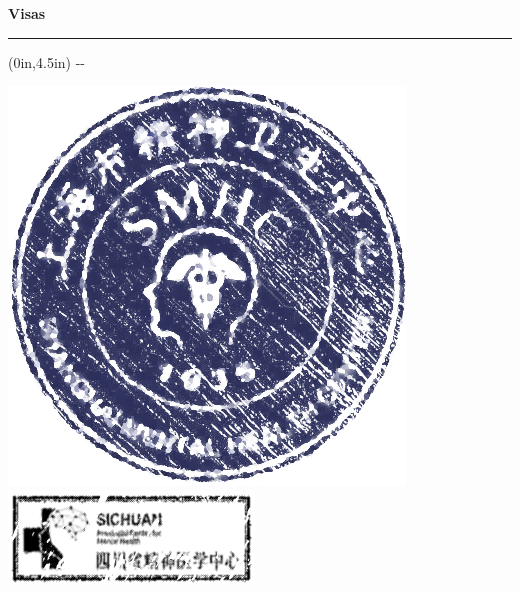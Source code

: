 \newpage
{}
\thispagestyle{empty}
\color{Blue}
\begin{center}
    \bf{
        \Large Visas
    }
    \vspace{0.15in}
    \hrule
\end{center}
\begin{textblock*}{3.465in}(0in,4.5in)
    \centering
    \LARGE
    -\space{\bf\thepage}\space-
\end{textblock*}
\ifnum{}
    \ifnum{}
    \includegraphics[width=0.35\linewidth,angle=15]{images/demo_stamps/SMHC.png}
    \includegraphics[width=0.5\linewidth,angle=30]{images/demo_stamps/SCMH.png}
    \fi
\fi
\restoregeometry